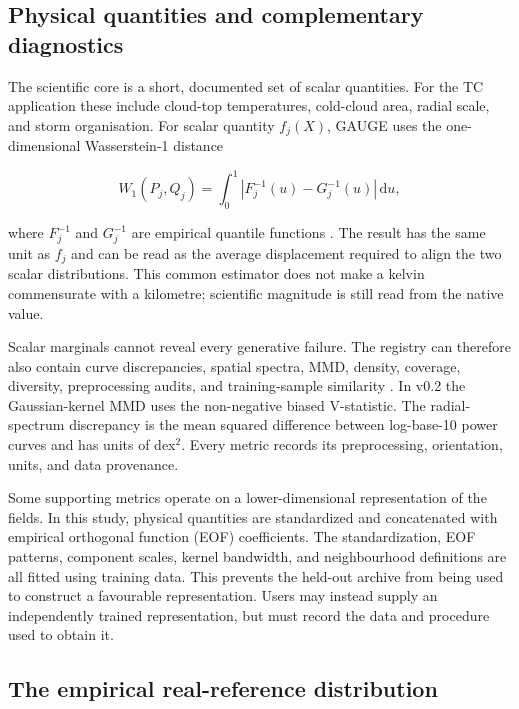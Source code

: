 \documentclass[gmd, manuscript]{copernicus}
\begin{document}
\subsection{Physical quantities and complementary diagnostics}

The scientific core is a short, documented set of scalar quantities. For the TC
application these include cloud-top temperatures, cold-cloud area, radial scale, and
storm organisation. For scalar quantity \(f_j(X)\), GAUGE uses the one-dimensional
Wasserstein-1 distance

\begin{equation}
W_1(P_j,Q_j) =
\int_0^1\left|F_j^{-1}(u)-G_j^{-1}(u)\right|\,\mathrm{d}u ,
\label{eq:w1}
\end{equation}

where \(F_j^{-1}\) and \(G_j^{-1}\) are empirical quantile functions
\citep{Villani2009}. The result has the same unit as \(f_j\) and can be read as the
average displacement required to align the two scalar distributions. This common
estimator does not make a kelvin commensurate with a kilometre; scientific magnitude
is still read from the native value.

Scalar marginals cannot reveal every generative failure. The registry can therefore
also contain curve discrepancies, spatial spectra, MMD, density, coverage, diversity,
preprocessing audits, and training-sample similarity
\citep{Gretton2012,Naeem2020}. In v0.2 the Gaussian-kernel MMD uses the non-negative
biased V-statistic. The radial-spectrum discrepancy is the mean squared difference
between log-base-10 power curves and has units of dex\({}^2\). Every metric records
its preprocessing, orientation, units, and data provenance.

Some supporting metrics operate on a lower-dimensional representation of the fields.
In this study, physical quantities are standardized and concatenated with empirical
orthogonal function (EOF) coefficients. The standardization, EOF patterns, component
scales, kernel bandwidth, and neighbourhood definitions are all fitted using training
data. This prevents the held-out archive from being used to construct a favourable
representation. Users may instead supply an independently trained representation,
but must record the data and procedure used to obtain it.

\subsection{The empirical real-reference distribution}
\label{sec:reference}
\end{document}
